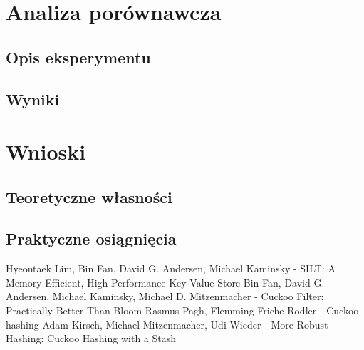 \documentclass[declaration,shortabstract,masc]{iithesis}
\begin{document}
	\chapter{Analiza porównawcza}
		\section{Opis eksperymentu}
		\section{Wyniki}
	\chapter{Wnioski}
		\section{Teoretyczne własności}
		\section{Praktyczne osiągnięcia}
	\begin{thebibliography}{3}
		 Hyeontaek Lim, Bin Fan, David G. Andersen, Michael Kaminsky - SILT: A Memory-Efficient, High-Performance Key-Value Store
		 Bin Fan, David G. Andersen, Michael Kaminsky, Michael D. Mitzenmacher - Cuckoo Filter: Practically Better Than Bloom
		 Rasmus Pagh, Flemming Friche Rodler - Cuckoo hashing
		 Adam Kirsch, Michael Mitzenmacher, Udi Wieder - More Robust Hashing: Cuckoo Hashing with a Stash
	\end{thebibliography}
\end{document}
